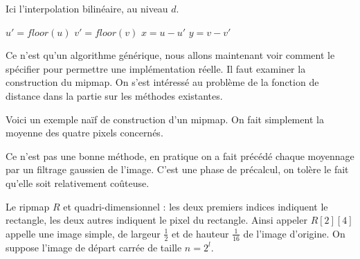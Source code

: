 \medbreak
\medbreak
Ici l'interpolation bilinéaire, au niveau $d$.
\medbreak
\medbreak

\begin{algorithm}[H]
\caption{$bilinearMipMap((u,v),M)$}
$u'=floor(u)$\;
$v' = floor(v)$\;
$x=u-u'$\;
$y = v-v'$\;
\;
\end{algorithm}

\medbreak
\medbreak
Ce n'est qu'un algorithme générique, nous allons maintenant voir comment le spécifier pour permettre une implémentation réelle. Il faut examiner la construction du mipmap. On s'est intéressé au problème de la fonction de distance dans la partie sur les méthodes existantes. %


Voici un exemple naïf de construction d'un mipmap. On fait simplement la moyenne des quatre pixels concernés.
 \medbreak
  \medbreak
 \begin{algorithm}[H]
 \caption{$buildMipMap(img)$}
 \end{algorithm}
 \medbreak
  \medbreak
 Ce n'est pas une bonne méthode, en pratique on a fait précédé chaque moyennage par un filtrage gaussien de l'image. C'est une phase de précalcul, on tolère le fait qu'elle soit relativement coûteuse.  




Le ripmap $R$ et quadri-dimensionnel  : les deux premiers indices indiquent le rectangle, les deux autres indiquent le pixel du rectangle. Ainsi appeler $R[2][4]$ appelle une image simple, de largeur $\frac{1}{2}$ et de hauteur $\frac{1}{16}$ de l'image d'origine. On suppose l'image de départ carrée de taille $n=2^l$.



